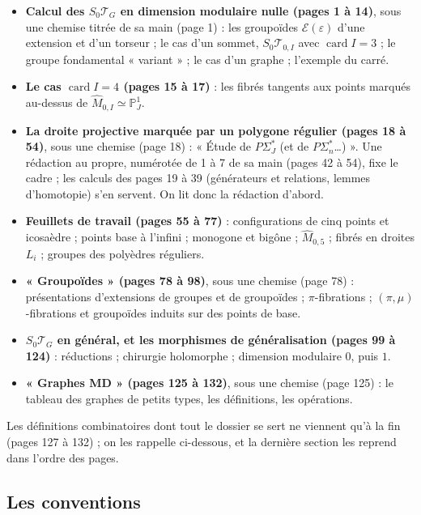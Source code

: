 \documentclass[11pt,a4paper]{article}
\begin{document}
\begin{itemize}
\item \textbf{Calcul des $S_0\mathcal{T}_G$ en dimension modulaire nulle
(pages 1 à 14)}, sous une chemise titrée de sa main (page 1) : les groupoïdes
$\mathcal{E}(\varepsilon)$ d'une extension et d'un torseur ; le cas d'un
sommet, $S_0\mathcal{T}_{0,I}$ avec $\operatorname{card} I = 3$ ; le groupe
fondamental « variant » ; le cas d'un graphe ; l'exemple du carré.
\item \textbf{Le cas $\operatorname{card} I = 4$ (pages 15 à 17)} : les fibrés
tangents aux points marqués au-dessus de $\widehat{M}_{0,I} \simeq
\mathbb{P}^1_J$.
\item \textbf{La droite projective marquée par un polygone régulier (pages 18
à 54)}, sous une chemise (page 18) : « Étude de $P\Sigma_J^{*}$ (et de
$P\Sigma_n^{*}$\ldots) ». Une rédaction au propre, numérotée de 1 à 7 de sa
main (pages 42 à 54), fixe le cadre ; les calculs des pages 19 à 39
(générateurs et relations, lemmes d'homotopie) s'en servent. On lit donc la
rédaction d'abord.
\item \textbf{Feuillets de travail (pages 55 à 77)} : configurations de cinq
points et icosaèdre ; points base à l'infini ; monogone et bigône ;
$\widehat{M}_{0,5}$ ; fibrés en droites $L_i$ ; groupes des polyèdres réguliers.
\item \textbf{« Groupoïdes » (pages 78 à 98)}, sous une chemise (page 78) :
présentations d'extensions de groupes et de groupoïdes ; $\pi$-fibrations ;
$(\pi, \mu)$-fibrations et groupoïdes induits sur des points de base.
\item \textbf{$S_0\mathcal{T}_G$ en général, et les morphismes de
généralisation (pages 99 à 124)} : réductions ; chirurgie holomorphe ;
dimension modulaire $0$, puis $1$.
\item \textbf{« Graphes MD » (pages 125 à 132)}, sous une chemise (page 125) :
le tableau des graphes de petits types, les définitions, les opérations.
\end{itemize}

Les définitions combinatoires dont tout le dossier se sert ne viennent qu'à la
fin (pages 127 à 132) ; on les rappelle ci-dessous, et la dernière section les
reprend dans l'ordre des pages.

\subsection*{Les conventions}
\end{document}
